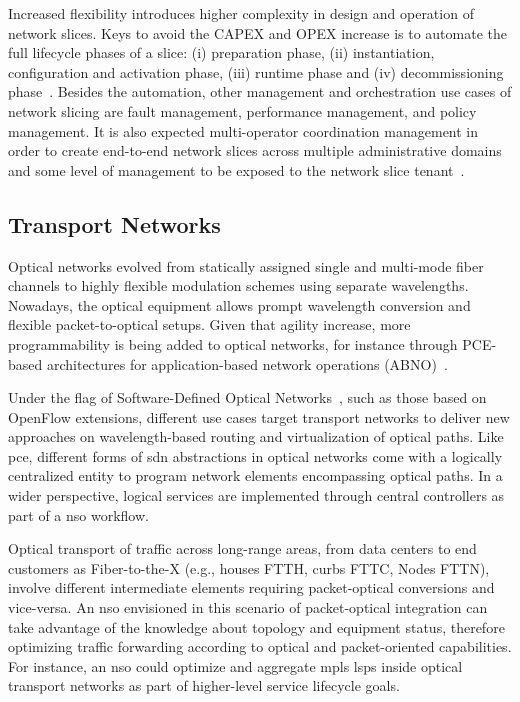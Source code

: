 Increased flexibility introduces higher complexity in design and operation of network slices. Keys to avoid the CAPEX and OPEX increase is to automate the full lifecycle phases of a slice: (i) preparation phase, (ii) instantiation, configuration and activation phase, (iii) runtime phase and (iv) decommissioning phase~\cite{3GPP:TR28801:2017}. Besides the automation, other management and orchestration use cases of network slicing are fault management, performance management, and policy management. It is also expected multi-operator coordination management in order to create end-to-end network slices across multiple administrative domains and some level of management to be exposed to the network slice tenant~\cite{Contreras:2018}.

\subsection{Transport Networks}
Optical networks evolved from statically assigned single and multi-mode fiber channels to highly flexible modulation schemes using separate wavelengths. Nowadays, the optical equipment allows prompt wavelength conversion and flexible packet-to-optical setups. Given that agility increase, more programmability is being added to optical networks, for instance through PCE-based architectures for application-based network operations (ABNO)~\cite{RFC7491}. 

Under the flag of Software-Defined Optical Networks~\cite{7503119}, such as those based on OpenFlow extensions, different use cases target transport networks to deliver new approaches on wavelength-based routing and virtualization of optical paths.  Like \gls{pce}, different forms of \gls{sdn} abstractions in optical networks come with a logically centralized entity to program network elements encompassing optical paths. In a wider perspective, logical services are implemented through central controllers as part of a \gls{nso} workflow.

Optical transport of traffic across long-range areas, from data centers to end customers as Fiber-to-the-X (e.g., houses FTTH, curbs FTTC, Nodes FTTN), involve different intermediate elements requiring packet-optical conversions and vice-versa. An \gls{nso} envisioned in this scenario of packet-optical integration can take advantage of the knowledge about topology and equipment status, therefore optimizing traffic forwarding according to optical and packet-oriented capabilities. For instance, an \gls{nso} could optimize and aggregate \gls{mpls} \glspl{lsp} inside optical transport networks as part of higher-level service lifecycle goals.

